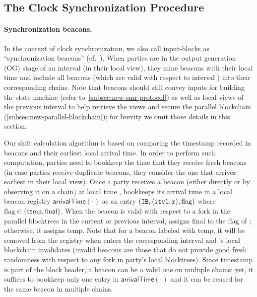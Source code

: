 \subsection{The Clock Synchronization Procedure}
\label{subsec:clock-sync-procedure}

\paragraph{Synchronization beacons.}
%
In the context of clock synchronization, we also call input-blocks as ``synchronization beacons'' (cf.~\cite{EC:BGKRZ21,TCC:GarKiaShe22}).
%
When parties are in the output generation (\textsf{OG}) stage of an interval \interval (in their local view), they mine beacons with their local time \protocolTime{\interval}{\round} and include all beacons (which are valid with respect to interval \interval) into their corresponding chains.
%
Note that beacons should still convey inputs for building the state machine (refer to~\cref{subsec:new-smr-protocol}) as well as local views of the previous interval to help retrieve the views and secure the parallel blockchain (\cref{subsec:new-parallel-blockchain}); for brevity we omit those details in this section.

Our shift calculation algorithm is based on comparing the timestamp recorded in beacons and their earliest local arrival time.
%
In order to perform such computation, parties need to bookkeep the time that they receive fresh beacons (in case parties receive duplicate beacons, they consider the one that arrives earliest in their local view).
%
Once a party \party receives a beacon  (either directly or by observing it on a chain) at local time \protocolTime{\interval}{\round}, \party bookkeeps its arrival time in a local beacon registry $\mathsf{arrivalTime}(\cdot)$ as an entry $(\mathtt{IB}, \langle \mathtt{itvl}, \mathtt{r} \rangle, \mathrm{flag})$ where $\mathrm{flag} \in \{ \mathsf{temp}, \mathsf{final} \}$.
%
When the beacon  is valid with respect to a fork in the parallel blocktrees in the current or previous interval, \party assigns \textsf{final} to the $\mathrm{flag}$ of ; otherwise, it assigns \textsf{temp}.
%
Note that for a beacon  labeled with \textsf{temp}, it will be removed from the registry when \party enters the corresponding interval and \party's local blockchain invalidates  (invalid beacons are those that do not provide good fresh randomness with respect to any fork in party's local blocktrees).
%
Since timestamp is part of the block header, a beacon  can be a valid one on multiple chains; yet, it suffices to bookkeep only one entry in $\mathsf{arrivalTime}(\cdot)$ and it can be reused for the same beacon in multiple chains.

